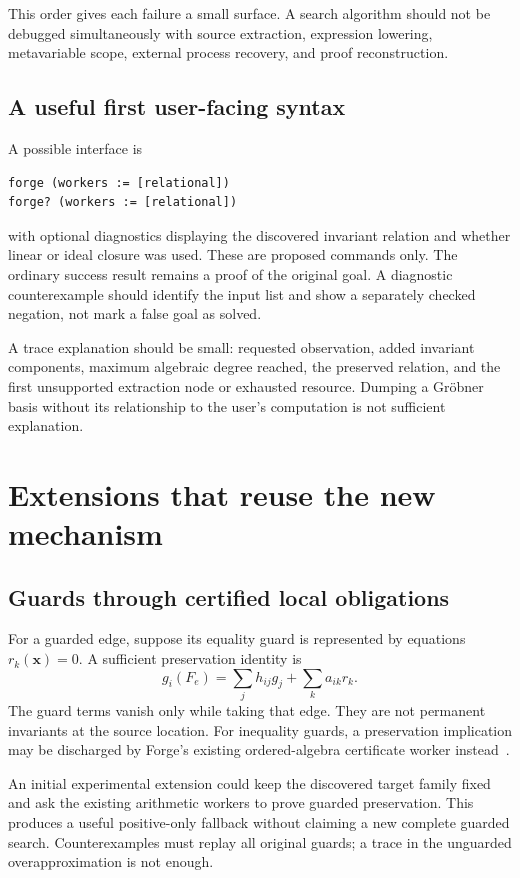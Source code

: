 \documentclass[11pt,letterpaper]{article}
\theoremstyle{definition}
\begin{document}
This order gives each failure a small surface. A search algorithm should not be
debugged simultaneously with source extraction, expression lowering,
metavariable scope, external process recovery, and proof reconstruction.

\subsection{A useful first user-facing syntax}
A possible interface is
\begin{lstlisting}
forge (workers := [relational])
forge? (workers := [relational])
\end{lstlisting}
with optional diagnostics displaying the discovered invariant relation and
whether linear or ideal closure was used. These are proposed commands only.
The ordinary success result remains a proof of the original goal. A diagnostic
counterexample should identify the input list and show a separately checked
negation, not mark a false goal as solved.

A trace explanation should be small: requested observation, added invariant
components, maximum algebraic degree reached, the preserved relation, and the
first unsupported extraction node or exhausted resource. Dumping a Gr\"obner
basis without its relationship to the user's computation is not sufficient
explanation.

\section{Extensions that reuse the new mechanism}
\label{sec:future}

\subsection{Guards through certified local obligations}
For a guarded edge, suppose its equality guard is represented by equations
$r_k(\bm x)=0$. A sufficient preservation identity is
\[
 g_i(F_e)=\sum_j h_{ij}g_j+\sum_k a_{ik}r_k.
\]
The guard terms vanish only while taking that edge. They are not permanent
invariants at the source location. For inequality guards, a preservation
implication may be discharged by Forge's existing ordered-algebra certificate
worker instead~\cite{forge-nonlinear}.

An initial experimental extension could keep the discovered target family
fixed and ask the existing arithmetic workers to prove guarded preservation.
This produces a useful positive-only fallback without claiming a new complete
guarded search. Counterexamples must replay all original guards; a trace in the
unguarded overapproximation is not enough.
\end{document}
